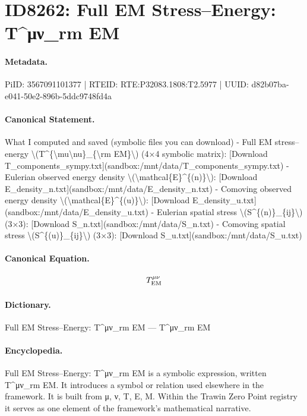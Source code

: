 \section*{ID8262: Full EM Stress–Energy: T\textasciicircum{}μν\_rm EM}
\paragraph{Metadata.}
PiID: 3567091101377 | RTEID: RTE:P32083.1808:T2.5977 | UUID: d82b07ba-e041-50e2-896b-5ddc9748fd4a

\paragraph{Canonical Statement.}
What I computed and saved (symbolic files you can download) - Full EM stress–energy \textbackslash{}(T\textasciicircum{}\{\textbackslash{}mu\textbackslash{}nu\}\_\{\textbackslash{}rm EM\}\textbackslash{}) (4×4 symbolic matrix): [Download T\_components\_sympy.txt](sandbox:/mnt/data/T\_components\_sympy.txt) - Eulerian observed energy density \textbackslash{}(\textbackslash{}mathcal\{E\}\textasciicircum{}\{(n)\}\textbackslash{}): [Download E\_density\_n.txt](sandbox:/mnt/data/E\_density\_n.txt) - Comoving observed energy density \textbackslash{}(\textbackslash{}mathcal\{E\}\textasciicircum{}\{(u)\}\textbackslash{}): [Download E\_density\_u.txt](sandbox:/mnt/data/E\_density\_u.txt) - Eulerian spatial stress \textbackslash{}(S\textasciicircum{}\{(n)\}\_\{ij\}\textbackslash{}) (3×3): [Download S\_n.txt](sandbox:/mnt/data/S\_n.txt) - Comoving spatial stress \textbackslash{}(S\textasciicircum{}\{(u)\}\_\{ij\}\textbackslash{}) (3×3): [Download S\_u.txt](sandbox:/mnt/data/S\_u.txt)

\paragraph{Canonical Equation.}
\[
T^{\mu\nu}_{\rm EM}
\]

\paragraph{Dictionary.}
Full EM Stress–Energy: T\textasciicircum{}μν\_rm EM — T\textasciicircum{}μν\_rm EM

\paragraph{Encyclopedia.}
Full EM Stress–Energy: T\textasciicircum{}μν\_rm EM is a symbolic expression, written T\textasciicircum{}μν\_rm EM. It introduces a symbol or relation used elsewhere in the framework. It is built from μ, ν, T, E, M. Within the Trawin Zero Point registry it serves as one element of the framework's mathematical narrative.
